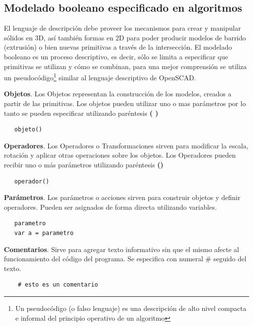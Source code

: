 \clearpage
\subsection{Modelado booleano especificado en algoritmos}

El lenguaje de descripción debe proveer los mecanismos para crear y manipular sólidos en 3D, así también formas en 2D para poder producir modelos de barrido (extrusión) o bien nuevas primitivas a través de la intersección. El  modelado  booleano  es  un proceso  descriptivo,  es  decir,  sólo  se limita  a  especificar que primitivas se utilizan y cómo se combinan, para una mejor comprensión se utiliza un pseudocódigo\footnote{Un pseudocódigo (o falso lenguaje) es una descripción de alto nivel compacta e informal del principio operativo de un algoritmo} similar al lenguaje descriptivo de OpenSCAD.

\textbf{Objetos}. Los Objetos representan la construcción de los modelos, creados a partir  de las primitivas. Los objetos pueden utilizar uno o mas parámetros por lo tanto se pueden especificar utilizando paréntesis \textbf{( )}

\begin{verbatim}
   objeto()
\end{verbatim}


\textbf{Operadores}. Los Operadores o Transformaciones sirven para modificar la escala, rotación y aplicar otras operaciones sobre los objetos. Los Operadores pueden recibir uno o más parámetros utilizando paréntesis \textbf{()}

\begin{verbatim}
   operador()
\end{verbatim}


\textbf{Parámetros}. Los parámetros o acciones sirven para construir objetos y definir operadores. Pueden ser asignados de forma directa utilizando variables.

\begin{verbatim}
   parametro
   var a = parametro
\end{verbatim}

\textbf{Comentarios}. Sirve para agregar texto informativo sin que el mismo afecte al funcionamiento del código del programa. Se especifica con numeral \# seguido del texto.
\begin{verbatim}
    # esto es un comentario
\end{verbatim}

